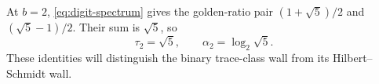 \begin{table}[t]
  \centering
  \small
  
  \caption{Display evaluations of the exact formulas in
  \cref{eq:kappa-explicit,eq:digit-comparisons}.  The last column is
  \(\sigma_c(q=2)=\max\{1,\log_b\kappa_{b,2}\}\); the decimals are not
  empirical estimates and do not define the theorem.}
  \label{tab:digit-thresholds}
\end{table}

At \(b=2\), \cref{eq:digit-spectrum} gives the golden-ratio pair
\((1+\sqrt5)/2\) and \((\sqrt5-1)/2\).  Their sum is \(\sqrt5\), so
\begin{equation}
  \tau_2=\sqrt5,
  \qquad
  \alpha_2=\log_2\sqrt5.
  \label{eq:binary-alpha}
\end{equation}
These identities will distinguish the binary trace-class wall from its
Hilbert--Schmidt wall.
